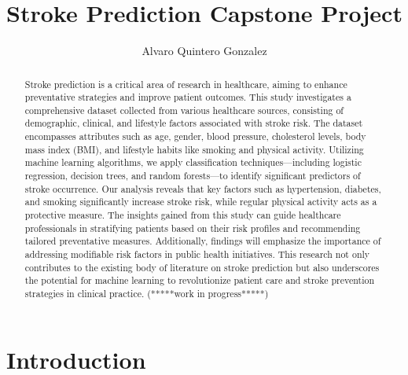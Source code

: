\documentclass[runningheads]{llncs}
\begin{document}
%
\title{Stroke Prediction Capstone Project}
%
%
\author{Alvaro Quintero Gonzalez}
%
%
%
\maketitle              %
%
\begin{abstract}
Stroke prediction is a critical area of research in healthcare, aiming to enhance preventative strategies and improve patient outcomes. This study investigates a comprehensive dataset collected from various healthcare sources, consisting of demographic, clinical, and lifestyle factors associated with stroke risk. The dataset encompasses attributes such as age, gender, blood pressure, cholesterol levels, body mass index (BMI), and lifestyle habits like smoking and physical activity. Utilizing machine learning algorithms, we apply classification techniques—including logistic regression, decision trees, and random forests—to identify significant predictors of stroke occurrence. Our analysis reveals that key factors such as hypertension, diabetes, and smoking significantly increase stroke risk, while regular physical activity acts as a protective measure. The insights gained from this study can guide healthcare professionals in stratifying patients based on their risk profiles and recommending tailored preventative measures. Additionally, findings will emphasize the importance of addressing modifiable risk factors in public health initiatives. This research not only contributes to the existing body of literature on stroke prediction but also underscores the potential for machine learning to revolutionize patient care and stroke prevention strategies in clinical practice. (*****work in progress*****)

\end{abstract}
%
%
%
\section{Introduction}
\end{document}
